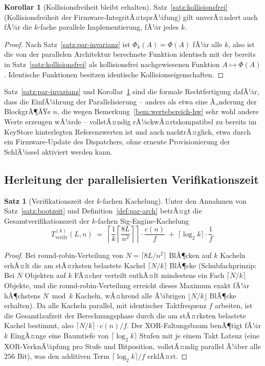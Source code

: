 ﻿\documentclass[a4paper,12pt]{article}
\theoremstyle{definition}
\newtheorem{satz}{Satz}
\newtheorem{korollar}{Korollar}
\begin{document}
\begin{korollar}[Kollisionsfreiheit bleibt erhalten]
	\label{kor:par-kollisionsfrei}
	Satz~\ref{satz:kollisionsfrei} (Kollisionsfreiheit der Firmware-IntegritÃ¤tsprÃ¼fung) gilt unverÃ¤ndert auch fÃ¼r die $k$-fache parallele Implementierung, fÃ¼r jedes $k$.
\end{korollar}

\begin{proof}
	Nach Satz~\ref{satz:par-invarianz} ist $\Phi_k(A) = \Phi(A)$ fÃ¼r alle $k$, also ist die von der parallelen Architektur berechnete Funktion identisch mit der bereits in Satz~\ref{satz:kollisionsfrei} als kollisionsfrei nachgewiesenen Funktion $A \mapsto \Phi(A)$. Identische Funktionen besitzen identische Kollisionseigenschaften. \qedhere
\end{proof}

Satz~\ref{satz:par-invarianz} und Korollar~\ref{kor:par-kollisionsfrei} sind die formale Rechtfertigung dafÃ¼r, dass die EinfÃ¼hrung der Parallelisierung -- anders als etwa eine Ã„nderung der BlockgrÃ¶ÃŸe $n$, die wegen Bemerkung~\ref{bem:wertebereich-hw} sehr wohl andere Werte erzeugen wÃ¼rde -- vollstÃ¤ndig rÃ¼ckwÃ¤rtskompatibel zu bereits im KeyStore hinterlegten Referenzwerten ist und auch nachtrÃ¤glich, etwa durch ein Firmware-Update des Dispatchers, ohne erneute Provisionierung der SchlÃ¼ssel aktiviert werden kann.

\subsection{Herleitung der parallelisierten Verifikationszeit}

\begin{satz}[Verifikationszeit der $k$-fachen Kachelung]
	\label{satz:par-zeit}
	Unter den Annahmen von Satz~\ref{satz:bootzeit} und Definition~\ref{def:par-arch} betrÃ¤gt die Gesamtverifikationszeit der $k$-fachen Sig-Engine-Kachelung
	\[
	T_{\mathrm{verify}}^{(k)}(L,n) \;=\; \left\lceil \frac{1}{k}\left\lceil \frac{8L}{n^2}\right\rceil\right\rceil \cdot \frac{c(n)}{f} \;+\; \lceil \log_2 k\rceil \cdot \frac{1}{f}.
	\]
\end{satz}

\begin{proof}
	Bei round-robin-Verteilung von $N = \lceil 8L/n^2\rceil$ BlÃ¶cken auf $k$ Kacheln erhÃ¤lt die am stÃ¤rksten belastete Kachel $\lceil N/k\rceil$ BlÃ¶cke (Schubfachprinzip: Bei $N$ Objekten auf $k$ FÃ¤cher verteilt enthÃ¤lt mindestens ein Fach $\lceil N/k\rceil$ Objekte, und die round-robin-Verteilung erreicht dieses Maximum exakt fÃ¼r hÃ¶chstens $N \bmod k$ Kacheln, wÃ¤hrend alle Ã¼brigen $\lfloor N/k\rfloor$ BlÃ¶cke erhalten). Da alle Kacheln parallel, mit identischer Taktfrequenz $f$ arbeiten, ist die Gesamtlaufzeit der Berechnungsphase durch die am stÃ¤rksten belastete Kachel bestimmt, also $\lceil N/k\rceil \cdot c(n)/f$. Der XOR-Faltungsbaum benÃ¶tigt fÃ¼r $k$ EingÃ¤nge eine Baumtiefe von $\lceil \log_2 k\rceil$ Stufen mit je einem Takt Latenz (eine XOR-VerknÃ¼pfung pro Stufe und Bitposition, vollstÃ¤ndig parallel Ã¼ber alle $256$ Bit), was den additiven Term $\lceil \log_2 k\rceil / f$ erklÃ¤rt. \qedhere
\end{proof}
\end{document}
